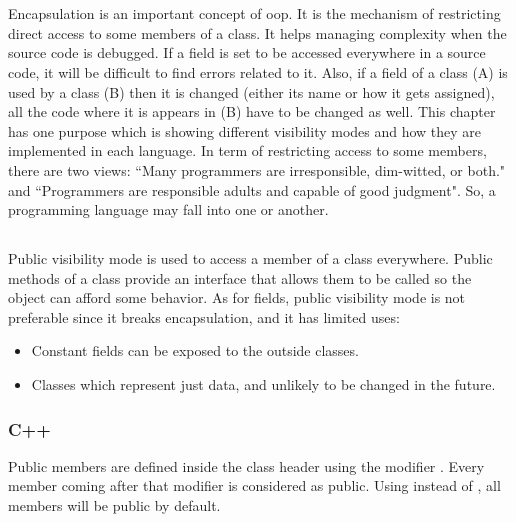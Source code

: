 \documentclass{KodeBook}
\begin{document}
\fi

\chapter{}

\begin{introduction}
	Encapsulation is an important concept of \ac{oop}. 
	It is the mechanism of restricting direct access to some members of a class.
	It helps managing complexity when the source code is debugged. 
	If a field is set to be accessed everywhere in a source code, it will be difficult to find errors related to it. 
	Also, if a field of a class (A) is used by a class (B) then it is changed (either its name or how it gets assigned), all the code where it is appears in (B) have to be changed as well. 
	This chapter has one purpose which is showing different visibility modes and how they are implemented in each language.
	In term of restricting access to some members, there are two views: ``Many programmers are irresponsible, dim-witted, or both." and ``Programmers are responsible adults and capable of good judgment".
	So, a programming language may fall into one or another.
\end{introduction} 

\section{}

Public visibility mode is used to access a member of a class everywhere. 
Public methods of a class provide an interface that allows them to be called so the object can afford some behavior. 
As for fields, public visibility mode is not preferable since it breaks encapsulation, and it has limited uses:
\begin{itemize}
	\item Constant fields can be exposed to the outside classes.%
	\item Classes which represent just data, and unlikely to be changed in the future.
\end{itemize}

\subsection{C++}

Public members are defined inside the class header using the modifier . 
Every member coming after that modifier is considered as public.
Using  instead of , all members will be public by default.
\end{document}
